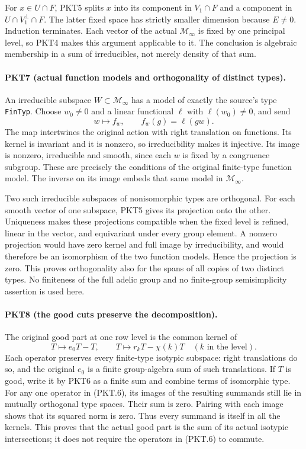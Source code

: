 For $x\in U\cap F$, PKT5 splits $x$ into its component in $V_1\cap F$
and a component in $U\cap V_1^\perp\cap F$.  The latter fixed space has
strictly smaller dimension because $E\ne0$.  Induction terminates.  Each
vector of the actual $\mathcal M_\infty$ is fixed by one principal level,
so PKT4 makes this argument applicable to it.  The conclusion is algebraic
membership in a sum of irreducibles, not merely density of that sum.

\paragraph{PKT7 (actual function models and orthogonality of distinct types).}\label{claim:PKT7}
An irreducible subspace $W\subset\mathcal M_\infty$ has a model of exactly
the source's type \texttt{FinTyp}.  Choose $w_0\ne0$ and a linear
functional $\ell$ with $\ell(w_0)\ne0$, and send
\[
 w\longmapsto f_w,\qquad f_w(g)=\ell(gw).
\]
The map intertwines the original action with right translation on functions.
Its kernel is invariant and it is nonzero, so irreducibility makes it
injective.  Its image is nonzero, irreducible and smooth, since each $w$ is
fixed by a congruence subgroup.  These are precisely the conditions of the
original finite-type function model.  The inverse on its image embeds that
same model in $\mathcal M_\infty$.

Two such irreducible subspaces of nonisomorphic types are orthogonal.
For each smooth vector of one subspace, PKT5 gives its projection onto the
other.  Uniqueness makes these projections compatible when the fixed level
is refined, linear in the vector, and equivariant under every group element.
A nonzero projection would have zero kernel and full image by irreducibility,
and would therefore be an isomorphism of the two function models.  Hence
the projection is zero.  This proves orthogonality also for the spans of all
copies of two distinct types.  No finiteness of the full adelic group and no
finite-group semisimplicity assertion is used here.

\paragraph{PKT8 (the good cuts preserve the decomposition).}\label{claim:PKT8}
The original good part at one row level is the common kernel of
\[
 T\longmapsto e_0T-T,
 \qquad T\longmapsto r_kT-\chi(k)T\quad(k\text{ in the level}).
 \tag{PKT.6}
\]
Each operator preserves every finite-type isotypic subspace: right
translations do so, and the original $e_0$ is a finite group-algebra sum of
such translations.  If $T$ is good, write it by PKT6 as a finite sum and
combine terms of isomorphic type.  For any one operator in (PKT.6), its
images of the resulting summands still lie in mutually orthogonal type
spaces.  Their sum is zero.  Pairing with each image shows that its squared
norm is zero.  Thus every summand is itself in all the kernels.  This proves
that the actual good part is the sum of its actual isotypic intersections;
it does not require the operators in (PKT.6) to commute.

